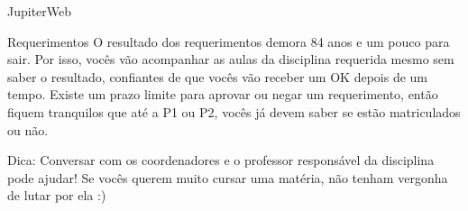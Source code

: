 \begin{secao}{JupiterWeb}
\begin{subsecao}{Requerimentos}
O resultado dos requerimentos demora 84 anos e um pouco para sair. Por isso,
vocês vão acompanhar as aulas da disciplina requerida mesmo sem saber o
resultado, confiantes de que vocês vão receber um OK depois de um tempo. Existe
um prazo limite para aprovar ou negar um requerimento, então fiquem tranquilos
que até a P1 ou P2, vocês já devem saber se estão matriculados ou não.

Dica: Conversar com os coordenadores e o professor responsável da disciplina
pode ajudar! Se vocês querem muito cursar uma matéria, não tenham vergonha de
lutar por ela :)

\end{subsecao}

\end{secao}
